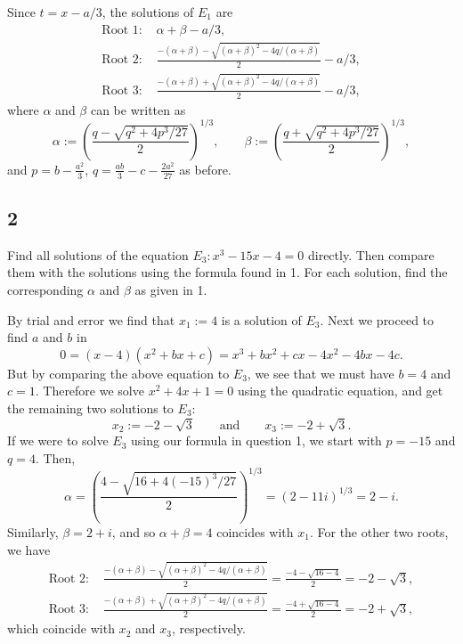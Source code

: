 \documentclass[12pt]{article}
\begin{document}
Since $t = x - a / 3$, the solutions of $E_{1}$ are 
\begin{align*}
\text{Root 1: } & \alpha + \beta - a/3, \\
\text{Root 2: } & \frac{-(\alpha + \beta) - \sqrt{(\alpha+\beta)^{2} - 4q/(\alpha+\beta)}}{2} - a/3, \\
\text{Root 3: } & \frac{-(\alpha + \beta) + \sqrt{(\alpha+\beta)^{2} - 4q/(\alpha+\beta)}}{2} - a/3,
\end{align*}
where $\alpha$ and $\beta$ can be written as 
\[ \alpha := \left( \frac{q - \sqrt{q^{2} + 4p^{3}/27}}{2} \right)^{1/3}, \qquad \beta := \left( \frac{q + \sqrt{q^{2} + 4p^{3}/27}}{2} \right)^{1/3},
\]
and $p = b - \frac{a^{2}}{3}$, $q = \frac{ab}{3} - c - \frac{2a^{2}}{27}$ as before.






\subsection*{2}
\begin{tcolorbox}
Find all solutions of the equation $E_{3} : x^{3} - 15x - 4 = 0$ directly. Then compare them with the solutions using the formula found in 1. For each
solution, find the corresponding $\alpha$ and $\beta$ as given in 1.
\end{tcolorbox}

By trial and error we find that $x_{1} := 4$ is a solution of $E_{3}$. Next we proceed to find $a$ and $b$ in 
\[ 0 = (x - 4)(x^{2} + bx + c) = x^{3} + bx^{2} + cx - 4x^{2} - 4bx - 4c. \]
But by comparing the above equation to $E_{3}$, we see that we must have $b = 4$ and $c = 1$. Therefore we solve $x^{2} + 4x + 1 = 0$ using the
quadratic equation, and get the remaining two solutions to $E_{3}$:
\[ x_{2} := -2 - \sqrt{3} \qquad \text{and} \qquad x_{3} := -2 + \sqrt{3}. \]
If we were to solve $E_{3}$ using our formula in question 1, we start with $p = -15$ and $q = 4$. Then,
\[ \alpha = \left( \frac{4 - \sqrt{16 + 4(-15)^{3}/27}}{2} \right)^{1/3} = (2 - 11i)^{1/3} = 2 - i. \]
Similarly, $\beta = 2 + i$, and so $\alpha + \beta = 4$ coincides with $x_{1}$. For the other two roots, we have 
\begin{align*}
\text{Root 2: } & \frac{-(\alpha + \beta) - \sqrt{(\alpha+\beta)^{2} - 4q/(\alpha+\beta)}}{2} = \frac{-4 - \sqrt{16 - 4}}{2} = -2 - \sqrt{3}, \\
\text{Root 3: } & \frac{-(\alpha + \beta) + \sqrt{(\alpha+\beta)^{2} - 4q/(\alpha+\beta)}}{2} = \frac{-4 + \sqrt{16 - 4}}{2} = -2 + \sqrt{3},
\end{align*}
which coincide with $x_{2}$ and $x_{3}$, respectively.
\end{document}
